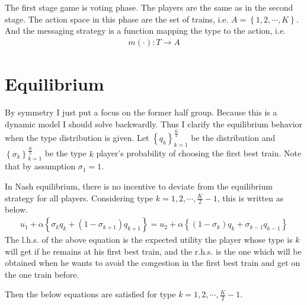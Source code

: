 \documentclass{article}
\begin{document}
The first stage game is voting phase. The players are the same as in the second stage. The action space in this phase are the set of trains, i.e. $A = \left\{ 1,2,\cdots, K \right\}$. And the messaging strategy is a function mapping the type to the action, i.e.
\begin{align*}
	m(\cdot) : T \to A
\end{align*}

\section{Equilibrium}
By symmetry I just put a focus on the former half group. Because this is a dynamic model I should solve backwardly. Thus I clarify the equilibrium behavior when the type distribution is given. Let $\left\{ q_k \right\}_{k = 1}^{\frac{K}{2}}$ be the distribution and $\left\{ \sigma_k \right\}_{k = 1}^{\frac{K}{2}}$ be the type $k$ player's probability of choosing the first best train. Note that by assumption $\sigma_1 = 1$. 

In Nash equilibrium, there is no incentive to deviate from the equilibrium strategy for all players. Considering type $k = 1, 2, \cdots, \frac{K}{2} -1$, this is written as below.
\begin{align*}
	u_1 + \alpha \left\{ \sigma_k q_k + (1-\sigma_{k+1}) q_{k+1} \right\} = u_2 + \alpha \left\{ (1-\sigma_k) q_k + \sigma_{k-1} q_{k-1} \right\}
\end{align*}
The l.h.s. of the above equation is the expected utility the player whose type is $k$ will get if he remains at his first best train, and the r.h.s. is the one which will be obtained when he wants to avoid the congestion in the first best train and get on the one train before.

Then the below equations are satisfied for type $k = 1, 2, \cdots, \frac{K}{2} -1$.
\end{document}
